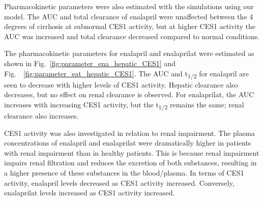 Pharmacokinetic parameters were also estimated with the simulations using our model. The AUC and total clearance of enalapril were unaffected between the 4 degrees of cirrhosis at subnormal CES1 activity, but at higher CES1 activity the AUC was increased and total clearance decreased compared to normal conditions.


The pharmacokinetic parameters for enalapril and enalaprilat were estimated as shown in Fig.~\ref{fig:parameter_ena_hepatic_CES1} and Fig.~~\ref{fig:parameter_eat_hepatic_CES1}. The AUC and t\textsubscript{1/2} for enalapril are seen to decrease with higher levels of CES1 activity. Hepatic clearance also decreases, but no effect on renal clearance is observed. For enalaprilat, the AUC increases with increasing CES1 activity, but the t\textsubscript{1/2} remains the same; renal clearance also increases.


CES1 activity was also investigated in relation to renal impairment. The plasma concentrations of enalapril and enalaprilat were dramatically higher in patients with renal impairment than in healthy patients. This is because renal impairment impairs renal filtration and reduces the excretion of both substances, resulting in a higher presence of these substances in the blood/plasma. In terms of CES1 activity, enalapril levels decreased as CES1 activity increased. Conversely, enalaprilat levels increased as CES1 activity increased.

